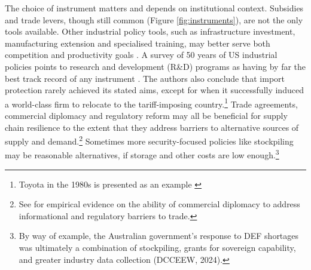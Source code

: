 \documentclass{article}
\begin{document}
The choice of instrument matters and depends on institutional context. Subsidies and trade levers, though still common (Figure \ref{fig:instruments}), are not the only tools available. Other industrial policy tools, such as infrastructure investment, manufacturing extension and specialised training, may better serve both competition and productivity goals \parencite{juhasz_new_2023}. A survey of 50 years of US industrial policies points to research and development (R\&D) programs as having by far the best track record of any instrument \parencite{hufbauer_scoring_2021}. The authors also conclude that import protection rarely achieved its stated aims, except for when it successfully induced a world-class firm to relocate to the tariff-imposing country.\footnote{Toyota in the 1980s is presented as an example \parencite{hufbauer_scoring_2021}} Trade agreements, commercial diplomacy and regulatory reform may all be beneficial for supply chain resilience to the extent that they address barriers to alternative sources of supply and demand.\footnote{See \textcite{fry-mckibbin_does_2019} for empirical evidence on the ability of commercial diplomacy to address informational and regulatory barriers to trade.} Sometimes more security-focused policies like stockpiling may be reasonable alternatives, if storage and other costs are low enough.\footnote{By way of example, the Australian government's response to DEF shortages was ultimately a combination of stockpiling, grants for sovereign capability, and greater industry data collection (DCCEEW, 2024).}
\end{document}
